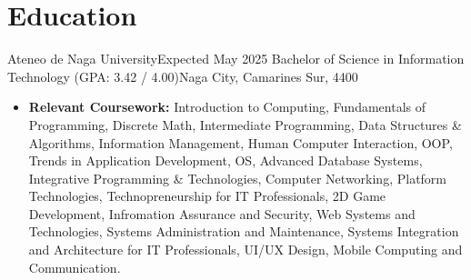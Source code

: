 \section{Education}

\resumeSubHeadingListStart
    \resumeSubheading
    {Ateneo de Naga University}{Expected May 2025}
    {Bachelor of Science in Information Technology (GPA: 3.42 / 4.00)}{Naga City, Camarines Sur, 4400}
    \begin{itemize}
        \item \textbf{Relevant Coursework:} Introduction to Computing, Fundamentals of Programming, Discrete Math, Intermediate Programming, Data Structures \& Algorithms, Information Management, Human Computer Interaction, OOP, Trends in Application Development, OS, Advanced Database Systems, Integrative Programming \& Technologies, Computer Networking, Platform Technologies, Technopreneurship for IT Professionals, 2D Game Development, Infromation Assurance and Security, Web Systems and Technologies, Systems Administration and Maintenance, Systems Integration and Architecture for IT Professionals, UI/UX Design, Mobile Computing and Communication.
    \end{itemize}
\resumeSubHeadingListEnd
